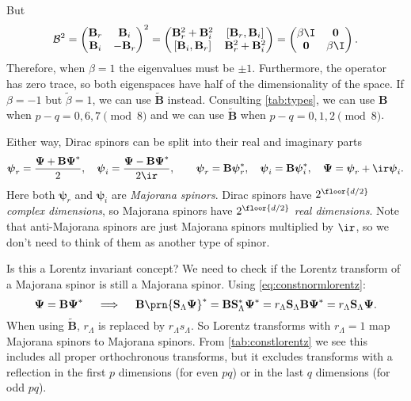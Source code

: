\documentclass[11pt]{article}
\newcommand{\cc}{^\ast}
\renewcommand{\S}{\mathbf{S}}
\newcommand{\B}{\mathbf{B}}
\newcommand{\Bt}{\widetilde{\B}}
\newcommand{\psib}{\boldsymbol{\psi}}
\newcommand{\Psib}{\boldsymbol{\Psi}}
\newcommand{\betat}{\tilde{\beta}}
\begin{document}
But
%
\begin{equation*}
  \mathcal{B}^2 =
    \begin{pmatrix}
      \B_r &  \B_i \\
      \B_i & -\B_r \\
    \end{pmatrix}^2
  =
    \begin{pmatrix}
      \B_r^2 + \B_i^2 & [\B_r, \B_i]    \\
      [\B_i, \B_r]    & \B_r^2 + \B_i^2 \\
    \end{pmatrix}
  =
    \begin{pmatrix}
      \beta \I   & \mathbf{0} \\
      \mathbf{0} & \beta \I   \\
    \end{pmatrix}.
\end{equation*}
%
Therefore, when \(\beta=1\) the eigenvalues must be \(\pm 1\).
Furthermore, the operator has zero trace, so both eigenspaces have half of the dimensionality of the space.
If \(\beta=-1\) but \(\betat=1\), we can use \(\Bt\) instead.
Consulting \cref{tab:types}, we can use \(\B\) when \(p-q = 0,6,7 \pmod 8\) and we can use \(\Bt\) when \(p-q = 0,1,2 \pmod 8\).

Either way, Dirac spinors can be split into their real and imaginary parts
%
\begin{equation}\label{eq:majorana}
  \psib_r = \frac{\Psib + \B \Psib\cc}{2},
  \quad
  \psib_i = \frac{\Psib - \B \Psib\cc}{2\ir},
  \qquad
  \psib_r = \B \psib\cc_r,
  \quad
  \psib_i = \B \psib\cc_i,
  \quad
  \Psib = \psib_r + \ir \psib_i.
\end{equation}
%
Here both \(\psib_r\) and \(\psib_i\) are \emph{Majorana spinors}.
Dirac spinors have \(2^{\floor{d/2}}\) \emph{complex dimensions}, so Majorana spinors have \(2^{\floor{d/2}}\) \emph{real dimensions}.
Note that anti-Majorana spinors are just Majorana spinors multiplied by \(\ir\), so we don't need to think of them as another type of spinor.

Is this a Lorentz invariant concept?
We need to check if the Lorentz transform of a Majorana spinor is still a Majorana spinor.
Using \cref{eq:constnormlorentz}:
%
\begin{equation*}
  \Psib = \B \Psib\cc
  \quad\implies\quad
  \B \prn{\S_\Lambda \Psib}\cc 
    = \B \S_\Lambda\cc \Psib\cc 
    = r_\Lambda \S_\Lambda \B \Psib\cc 
    = r_\Lambda \S_\Lambda \Psib.
\end{equation*}
%
When using \(\Bt\), \(r_\Lambda\) is replaced by \(r_\Lambda s_\Lambda\).
So Lorentz transforms with \(r_\Lambda = 1\) map Majorana spinors to Majorana spinors.
From \cref{tab:constlorentz} we see this includes all proper orthochronous transforms, but it excludes transforms with a reflection in the first \(p\) dimensions (for even \(pq\)) or in the last \(q\) dimensions (for odd \(pq\)).
\end{document}
